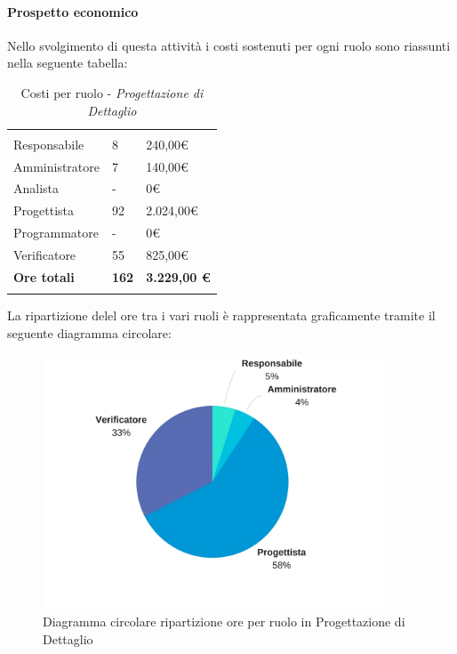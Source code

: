 			\paragraph{Prospetto economico} \Spazio
			Nello svolgimento di questa attività i costi sostenuti per ogni ruolo sono riassunti nella seguente tabella:
			\begin{table}[H]
			\centering
			\begin{tabular}{|p{4cm}|C{4cm}|C{4cm}|}
				
				 & &\\
				Responsabile & 8 & 240,00\euro \\
				\hline
				Amministratore& 7 & 140,00\euro \\
				\hline
				Analista & - & 0\euro \\
				\hline
				Progettista & 92 & 2.024,00\euro \\
				\hline
				Programmatore & - & 0\euro \\
				\hline
				Verificatore & 55 & 825,00\euro \\
				\hline
				\textbf{Ore totali} & \textbf{162} & \textbf{3.229,00 \euro} \\
			\end{tabular}
			\caption{Costi per ruolo - \textit{Progettazione di Dettaglio}}
		\end{table}
		
		La ripartizione delel ore tra i vari ruoli è rappresentata graficamente tramite il seguente diagramma circolare:
		
		\begin{figure}[h] 
			\centering 
			\includegraphics[width=0.9\textwidth]{images/CircolareProgettazioneDiDettaglio.jpg} 
			\caption{Diagramma circolare ripartizione ore per ruolo in Progettazione di Dettaglio}
			\label{CircolareProgettazioneDiDettaglio}
		\end{figure}		
		
